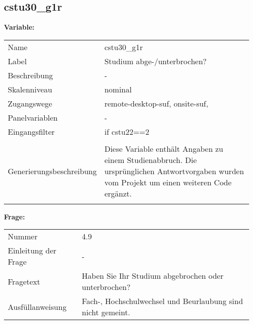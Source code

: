 	
	
	\subsection{cstu30\_g1r}
	\label{subSection:cstu30_g1r}

	\noindent\textbf{Variable:}\\
		\begin{tabular}{lL{11.3cm}}
			\label{tableVariable:cstu30_g1r}
			Name & cstu30\_g1r \\
			Label & Studium abge-/unterbrochen? \\
			Beschreibung & - \\
			Skalenniveau & nominal \\
			Zugangswege &
				remote-desktop-suf,
				onsite-suf,
 \\
			Panelvariablen & -
			 \\
			Eingangsfilter & if cstu22==2 \\
 \\
					Generierungsbeschreibung & Diese Variable enthält Angaben zu einem Studienabbruch. Die ursprünglichen Antwortvorgaben wurden vom Projekt um einen weiteren Code ergänzt. 
				 \\	
			 \\
		\end{tabular}

		\vspace*{1 cm}
		\noindent\textbf{Frage:}\\
		\begin{tabular}{lL{11.3cm}}
			\label{tableQuestion:cstu30_g1r}
			Nummer & 4.9 \\
			Einleitung der Frage & - \\
			Fragetext & Haben Sie Ihr Studium abgebrochen oder unterbrochen? \\
			Ausfüllanweisung & Fach-, Hochschulwechsel und Beurlaubung sind nicht gemeint. \\
		\end{tabular}





